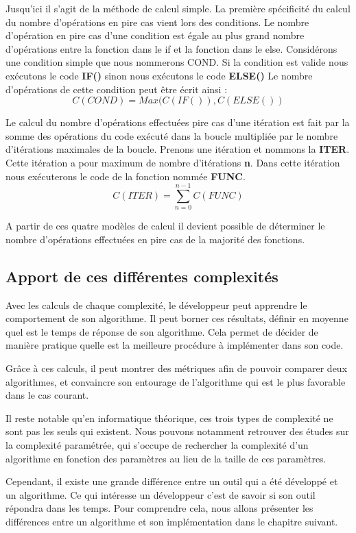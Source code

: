 \documentclass[12pt, twoside, openright]{report}
\begin{document}
Jusqu'ici il s'agit de la méthode de calcul simple. La première spécificité du calcul du nombre d'opérations en pire cas vient lors des conditions. Le nombre d'opération en pire cas d'une condition est égale au plus grand nombre d'opérations entre la fonction dans le if et la fonction dans le else. Considérons une condition simple que nous nommerons COND. Si la condition est valide nous exécutons le code \textbf{IF()} sinon nous exécutons le code \textbf{ELSE()} Le nombre d'opérations de cette condition peut être écrit ainsi :
\[{C(COND)=Max(C(IF()), C(ELSE())}\]

Le calcul du nombre d'opérations effectuées pire cas d'une itération est fait par la somme des opérations du code exécuté dans la boucle multipliée par le nombre d'itérations maximales de la boucle. Prenons une itération et nommons la \textbf{ITER}. Cette itération a pour maximum de nombre d'itérations \textbf{n}. Dans cette itération nous exécuterons le code de la fonction nommée \textbf{FUNC}.
\[{C(ITER)= \sum_{n=0}^{n-1} C(FUNC)}\]

A partir de ces quatre modèles de calcul il devient possible de déterminer le nombre d'opérations effectuées en pire cas de la majorité des fonctions.

\subsection{Apport de ces différentes complexités}

Avec les calculs de chaque complexité, le développeur peut apprendre le comportement de son algorithme. Il peut borner ces résultats, définir en moyenne quel est le temps de réponse de son algorithme. Cela permet de décider de manière pratique quelle est la meilleure procédure à implémenter dans son code. 

Grâce à ces calculs, il peut montrer des métriques afin de pouvoir comparer deux algorithmes, et convaincre son entourage de l'algorithme qui est le plus favorable dans le cas courant.

Il reste notable qu'en informatique théorique, ces trois types de complexité ne sont pas les seuls qui existent. Nous pouvons notamment retrouver des études sur la complexité paramétrée, qui s'occupe de rechercher la complexité d'un algorithme en fonction des paramètres au lieu de la taille de ces paramètres. 

Cependant, il existe une grande différence entre un outil qui a été développé et un algorithme. Ce qui intéresse un développeur c'est de savoir si son outil répondra dans les temps. Pour comprendre cela, nous allons présenter les différences entre un algorithme et son implémentation dans le chapitre suivant.
\end{document}
